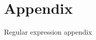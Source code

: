 \section{Appendix}
\label{section:appendix}

\label{section:appendix:regex}
Regular expression appendix









